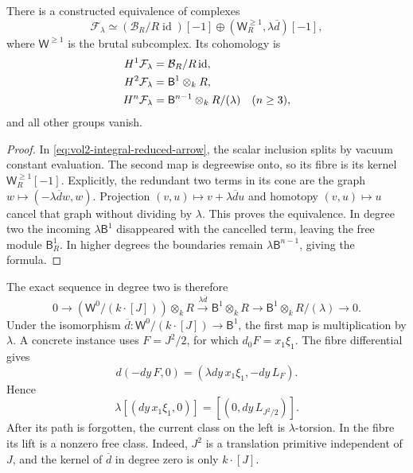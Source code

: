 \begin{theorem}\label{thm:vol2-integral-fibre}
There is a constructed equivalence of complexes
\begin{equation}\label{eq:vol2-integral-fibre-model}
 \mathcal F_\lambda\simeq
 (\mathcal B_R/R\operatorname{id})[-1]\oplus
       (\mathsf W_R^{\geq1},\lambda\overline d)[-1],
\end{equation}
where $\mathsf W^{\geq1}$ is the brutal subcomplex. Its cohomology is
\begin{align}\label{eq:vol2-integral-fibre-cohomology}
 H^1\mathcal F_\lambda&=\mathcal B_R/R\operatorname{id},\notag\\
 H^2\mathcal F_\lambda&=\mathsf B^1\otimes_kR,\notag\\
 H^n\mathcal F_\lambda&=\mathsf B^{n-1}\otimes_kR/(\lambda)
                              \quad(n\geq3),
\end{align}
and all other groups vanish.
\end{theorem}
\begin{proof}
In \eqref{eq:vol2-integral-reduced-arrow}, the scalar inclusion
splits by vacuum constant evaluation. The second map is
degreewise onto, so its fibre is its kernel
$\mathsf W_R^{\geq1}[-1]$. Explicitly, the redundant two terms
in its cone are the graph
$w\mapsto(-\lambda\overline dw,w)$.
Projection $(v,u)\mapsto v+\lambda\overline du$ and homotopy
$(v,u)\mapsto u$ cancel that graph without dividing by $\lambda$.
This proves the equivalence. In degree two the incoming
$\lambda\mathsf B^1$ disappeared with the cancelled term,
leaving the free module $\mathsf B^1_R$. In higher degrees the
boundaries remain $\lambda\mathsf B^{n-1}$, giving the formula.
\end{proof}

The exact sequence in degree two is therefore
\begin{equation}\label{eq:vol2-integral-path-extension}
 0\longrightarrow(\mathsf W^0/(k\cdot[J]))\otimes_kR
 \xrightarrow{\lambda\overline d}\mathsf B^1\otimes_kR
 \longrightarrow\mathsf B^1\otimes_kR/(\lambda)
 \longrightarrow0.
\end{equation}
Under the isomorphism
$\overline d:\mathsf W^0/(k\cdot[J])\to\mathsf B^1$, the
first map is multiplication by $\lambda$. A concrete instance
uses $F=J^2/2$, for which $d_0F=x_1\xi_1$. The fibre differential
gives
\[
 d(-dy\,F,0)=(\lambda dy\,x_1\xi_1,-dy\,L_F).
\]
Hence
\begin{equation}\label{eq:vol2-integral-path-witness}
 \boxed{\lambda[(dy\,x_1\xi_1,0)]
                 =[(0,dy\,L_{J^2/2})].}
\end{equation}
After its path is forgotten, the current class on the left is
$\lambda$-torsion. In the fibre its lift is a nonzero free class.
Indeed, $J^2$ is a translation primitive independent of $J$,
and the kernel of $\overline d$ in degree zero is only $k\cdot[J]$.

